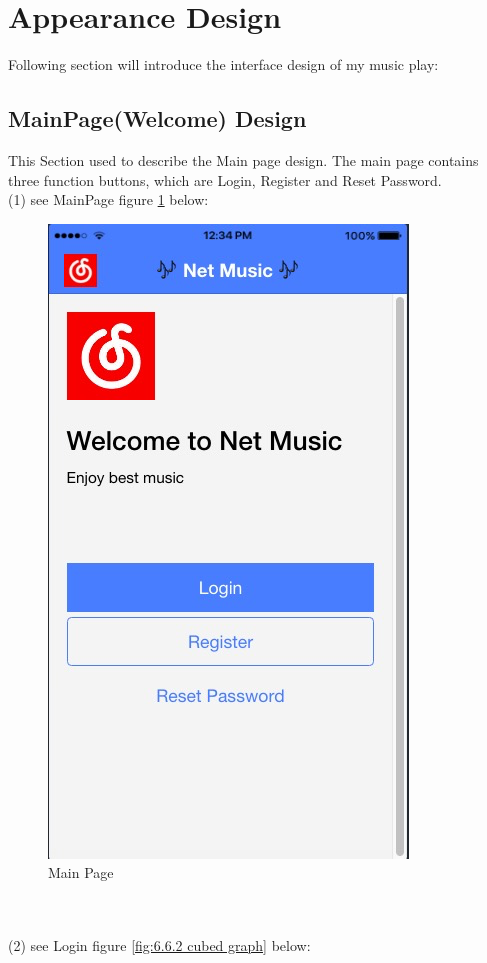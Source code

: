 \section{Appearance Design}
Following section will introduce the interface design of my music play: 
\subsection{MainPage(Welcome) Design}
This Section used to describe the Main page design. The main page contains three function buttons, which are Login, Register and Reset Password. \\ (1) see MainPage figure  \ref{fig:6.6.1 cubed graph} below:
\begin{figure}[h]
	\centering
	\includegraphics[scale=0.5]{img/MainPage1.png}
	\caption{Main Page}
	\label{fig:6.6.1 cubed graph}
\end{figure}
\\ \\ (2) see Login figure \ref{fig:6.6.2 cubed graph} below:
